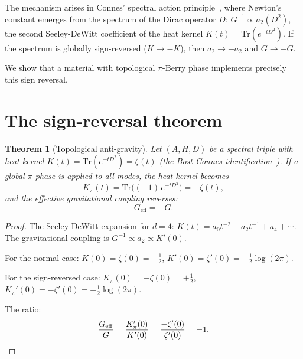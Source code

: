 \documentclass[aps,prl,twocolumn,superscriptaddress,nofootinbib]{revtex4-2}
\newtheorem{theorem}{Theorem}
\newcommand{\Tr}{\mathrm{Tr}}
\begin{document}
The mechanism arises in Connes' spectral action
principle~\cite{Chamseddine1996}, where Newton's constant
emerges from the spectrum of the Dirac operator $D$:
$G^{-1} \propto a_2(D^2)$, the second Seeley-DeWitt coefficient
of the heat kernel $K(t) = \Tr(e^{-tD^2})$.
If the spectrum is globally sign-reversed
($K \to -K$), then $a_2 \to -a_2$ and $G \to -G$.

We show that a material with topological $\pi$-Berry phase
implements precisely this sign reversal.

\section{The sign-reversal theorem}

\begin{theorem}[Topological anti-gravity]
\label{thm:antigrav}
Let $(A, H, D)$ be a spectral triple with heat kernel
$K(t) = \Tr(e^{-tD^2}) = \zeta(t)$
(the Bost-Connes identification~\cite{BostConnes1995}).
If a global $\pi$-phase is applied to all modes,
the heat kernel becomes
\begin{equation}
  K_\pi(t) = \Tr\bigl((-1)\,e^{-tD^2}\bigr) = -\zeta(t),
  \label{eq:minus_zeta}
\end{equation}
and the effective gravitational coupling reverses:
\begin{equation}
  \boxed{\;G_{\mathrm{eff}} = -G.\;}
  \label{eq:G_neg}
\end{equation}
\end{theorem}

\begin{proof}
The Seeley-DeWitt expansion for $d = 4$:
$K(t) = a_0 t^{-2} + a_2 t^{-1} + a_4 + \cdots$.
The gravitational coupling is
$G^{-1} \propto a_2 \propto K'(0)$.

For the normal case:
$K(0) = \zeta(0) = -\tfrac{1}{2}$,
$K'(0) = \zeta'(0) = -\tfrac{1}{2}\log(2\pi)$.

For the sign-reversed case:
$K_\pi(0) = -\zeta(0) = +\tfrac{1}{2}$,
$K_\pi'(0) = -\zeta'(0) = +\tfrac{1}{2}\log(2\pi)$.

The ratio:
\begin{equation}
  \frac{G_{\mathrm{eff}}}{G}
  = \frac{K_\pi'(0)}{K'(0)}
  = \frac{-\zeta'(0)}{\zeta'(0)}
  = -1. \qedhere
\end{equation}
\end{proof}
\end{document}
